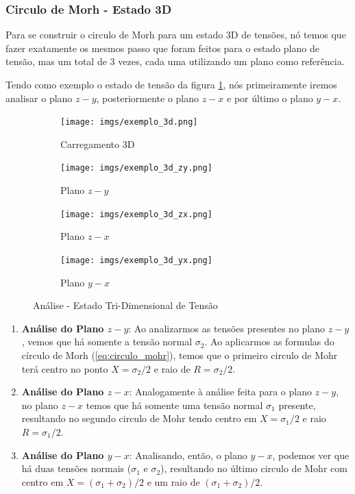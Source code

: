 \documentclass{article}
\begin{document}
\subsubsection{Circulo de Morh - Estado 3D}
Para se construir o circulo de Morh para um estado 3D de tensões, nó temos que fazer exatamente os mesmos passo que foram feitos para o estado plano de tensão, mas um total de 3 vezes, cada uma utilizando um plano como referência. 

Tendo como exemplo o estado de tensão da figura \ref{fig:carregamento_geral}, nós primeiramente iremos analisar o plano $z-y$, posteriormente o plano $z-x$ e por último o plano $y-x$.
\begin{figure}[h]

    \centering
    \begin{subfigure}[t]{.45\textwidth}
        \centering
        \texttt{[image: imgs/exemplo\_3d.png]}
        \caption{Carregamento 3D}
        \label{fig:carregamento_geral}
    \end{subfigure}
    \begin{subfigure}[t]{0.45\textwidth}
        \centering
        \texttt{[image: imgs/exemplo\_3d\_zy.png]}
        \caption{Plano $z-y$}
        \label{fig:enter-label}
    \end{subfigure}
        \begin{subfigure}[t]{.45\textwidth}
        \centering
        \texttt{[image: imgs/exemplo\_3d\_zx.png]}
        \caption{Plano $z-x$}
        \label{fig:enter-label}
    \end{subfigure}
    \begin{subfigure}[t]{.45\textwidth}
        \centering
        \texttt{[image: imgs/exemplo\_3d\_yx.png]}
        \caption{Plano $y-x$}
        \label{fig:enter-label}
    \end{subfigure}
    \caption{Análise - Estado Tri-Dimensional de Tensão}
\end{figure}

\begin{enumerate}
    \item \textbf{Análise do Plano $z-y$}: Ao analizarmos as tensões presentes no plano $z-y$, vemos que há somente a tensão normal $\sigma_2$. Ao aplicarmos as formulas do círculo de Morh (\ref{eq:circulo_mohr}), temos que o primeiro circulo de Mohr terá centro no ponto $X = \sigma_2/2$ e raio de $R = \sigma_2/2$.
    \item \textbf{Análise do Plano $z-x$}: Analogamente à análise feita para o plano $z-y$, no plano $z-x$ temos que há somente uma tensão normal $\sigma_1$ presente, resultando no segundo circulo de Mohr tendo centro em $X = \sigma_1/2$ e raio $R = \sigma_1/2$.
    \item \textbf{Análise do Plano $y-x$}: Analisando, então, o plano $y-x$, podemos ver que há duas tensões normais ($\sigma_1$ e $\sigma_2$), resultando no último circulo de Mohr com centro em $X = (\sigma_1 + \sigma_2)/2$ e um raio de $(\sigma_1 + \sigma_2)/2$.
\end{enumerate}
\end{document}
